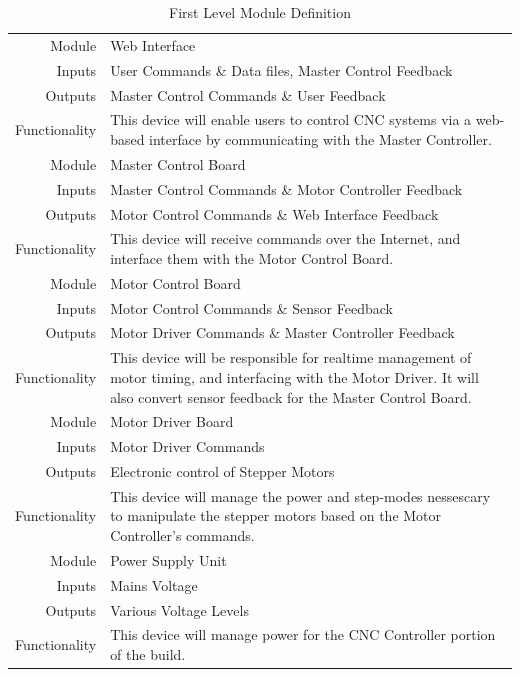 \begin{table}[ht] 
	\caption{First Level Module Definition}
	\label{table:firstlevel}
	\centering 
	\begin{tabular}{|r p{10cm}|} 
		\hline\hline 
		Module		& Web Interface \\ 
		Inputs		& User Commands \& Data files, Master Control Feedback	\\ 
		Outputs		& Master Control Commands \& User Feedback \\ 
		Functionality	& This device will enable users to control CNC systems via a web-based interface by communicating with the Master Controller.\\ 
		\hline\hline 
		Module		& Master Control Board \\ 
		Inputs		& Master Control Commands \& Motor Controller Feedback	\\ 
		Outputs		& Motor Control Commands \& Web Interface Feedback \\ 
		Functionality	& This device will receive commands over the Internet, and interface them with the Motor Control Board. \\
		\hline\hline 
		Module		& Motor Control Board \\ 
		Inputs		& Motor Control Commands \& Sensor Feedback	\\ 
		Outputs		& Motor Driver Commands \& Master Controller Feedback \\ 
		Functionality	& This device will be responsible for realtime management of motor timing, and interfacing with the Motor Driver. It will also convert sensor feedback for the Master Control Board.\\
		\hline\hline 
		Module		& Motor Driver Board \\ 
		Inputs		& Motor Driver Commands \\ 
		Outputs		& Electronic control of Stepper Motors \\ 
		Functionality	& This device will manage the power and step-modes nessescary to manipulate the stepper motors based on the Motor Controller's commands. \\
		\hline\hline 
		Module		& Power Supply Unit \\ 
		Inputs		& Mains Voltage	\\ 
		Outputs		& Various Voltage Levels \\ 
		Functionality	& This device will manage power for the CNC Controller portion of the build. \\
		\hline
		\end{tabular} 
\end{table}

